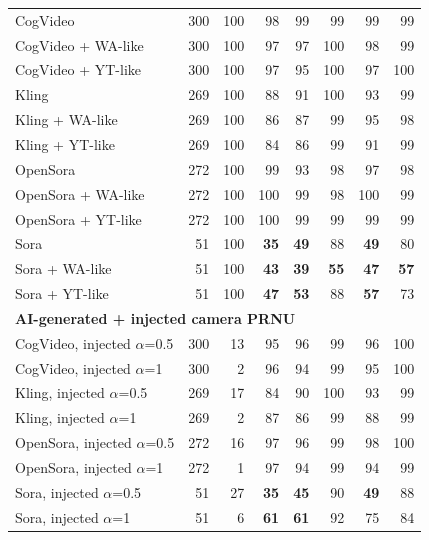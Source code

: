 \documentclass[11pt,a4paper]{article}
\begin{document}
{\begin{longtable}{p{7.0cm}rrrrrrr}
CogVideo & 300 & 100 & 98 & 99 & 99 & 99 & 99 \\
CogVideo + WA-like & 300 & 100 & 97 & 97 & 100 & 98 & 99 \\
CogVideo + YT-like & 300 & 100 & 97 & 95 & 100 & 97 & 100 \\
Kling & 269 & 100 & 88 & 91 & 100 & 93 & 99 \\
Kling + WA-like & 269 & 100 & 86 & 87 & 99 & 95 & 98 \\
Kling + YT-like & 269 & 100 & 84 & 86 & 99 & 91 & 99 \\
OpenSora & 272 & 100 & 99 & 93 & 98 & 97 & 98 \\
OpenSora + WA-like & 272 & 100 & 100 & 99 & 98 & 100 & 99 \\
OpenSora + YT-like & 272 & 100 & 100 & 99 & 99 & 99 & 99 \\
Sora & 51 & 100 & \textbf{35} & \textbf{49} & 88 & \textbf{49} & 80 \\
Sora + WA-like & 51 & 100 & \textbf{43} & \textbf{39} & \textbf{55} & \textbf{47} & \textbf{57} \\
Sora + YT-like & 51 & 100 & \textbf{47} & \textbf{53} & 88 & \textbf{57} & 73 \\
\midrule\multicolumn{8}{l}{\textbf{AI-generated + injected camera PRNU}} \\
CogVideo, injected $\alpha$=0.5 & 300 & 13 & 95 & 96 & 99 & 96 & 100 \\
CogVideo, injected $\alpha$=1 & 300 & 2 & 96 & 94 & 99 & 95 & 100 \\
Kling, injected $\alpha$=0.5 & 269 & 17 & 84 & 90 & 100 & 93 & 99 \\
Kling, injected $\alpha$=1 & 269 & 2 & 87 & 86 & 99 & 88 & 99 \\
OpenSora, injected $\alpha$=0.5 & 272 & 16 & 97 & 96 & 99 & 98 & 100 \\
OpenSora, injected $\alpha$=1 & 272 & 1 & 97 & 94 & 99 & 94 & 99 \\
Sora, injected $\alpha$=0.5 & 51 & 27 & \textbf{35} & \textbf{45} & 90 & \textbf{49} & 88 \\
Sora, injected $\alpha$=1 & 51 & 6 & \textbf{61} & \textbf{61} & 92 & 75 & 84 \\
\end{longtable}}
\end{document}
